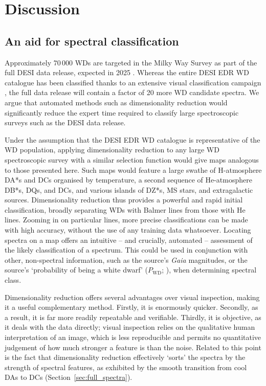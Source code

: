 \documentclass[fleqn,usenatbib]{mnras}
\begin{document}
\section{Discussion}
\label{sec:discussion}

\subsection{An aid for spectral classification}

Approximately $70\,000$ WDs are targeted in the Milky Way Survey as part of the full DESI data release, expected in 2025 \citep{cooper23}.
Whereas the entire DESI EDR WD catalogue has been classified thanks to an extensive visual classification campaign \citep{manser24}, the full data release will contain a factor of 20 more WD candidate spectra.
We argue that automated methods such as dimensionality reduction would significantly reduce the expert time required to classify large spectroscopic surveys such as the DESI data release.

Under the assumption that the DESI EDR WD catalogue is representative of the WD population, applying dimensionality reduction to any large WD spectroscopic survey with a similar selection function would give maps analogous to those presented here.
Such maps would feature a large swathe of H-atmosphere DA*s and DCs organised by temperature, a second sequence of He-atmosphere DB*s, DQs, and DCs, and various islands of DZ*s, MS stars, and extragalactic sources.
Dimensionality reduction thus provides a powerful and rapid initial classification, broadly separating WDs with Balmer lines from those with He lines.
Zooming in on particular lines, more precise classifications can be made with high accuracy, without the use of any training data whatsoever.
Locating spectra on a map offers an intuitive -- and crucially, automated -- assessment of the likely classification of a spectrum.
This could be used in conjunction with other, non-spectral information, such as the source's \textit{Gaia} magnitudes, or the source's `probability of being a white dwarf' ($P_\text{WD}$; \citealt{gentilefusillo15}), when determining spectral class.

Dimensionality reduction offers several advantages over visual inspection, making it a useful complementary method.
Firstly, it is enormously quicker.
Secondly, as a result, it is far more readily repeatable and verifiable.
Thirdly, it is objective, as it deals with the data directly; visual inspection relies on the qualitative human interpretation of an image, which is less reproducible and permits no quantitative judgement of how much stronger a feature is than the noise.
Related to this point is the fact that dimensionality reduction effectively `sorts' the spectra by the strength of spectral features, as exhibited by the smooth transition from cool DAs to DCs (Section~\ref{sec:full_spectra}).
\end{document}

